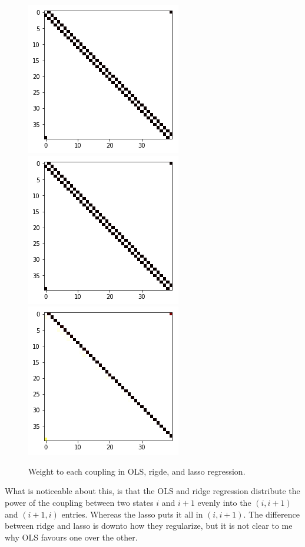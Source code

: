 \documentclass[parskip=half]{scrartcl}
\theoremstyle{definition}
\theoremstyle{remark}
\begin{document}
\begin{figure}[H]
\caption{Weight to each coupling in OLS, rigde, and lasso regression.}
\centering
\includegraphics[scale=0.4]{ols.png}
\includegraphics[scale=0.4]{ridge.png}
\includegraphics[scale=0.4]{lasso.png}
\end{figure}

What is noticeable about this, is that the OLS and ridge regression distribute the power of the coupling between two states $i$ and $i+1$ evenly into the $(i, i+1)$ and $(i+1, i)$ entries. 
Whereas the lasso puts it all in $(i, i+1)$. 
The difference between ridge and lasso is downto how they regularize, but it is not clear to me why OLS favours one over the other.  
\end{document}
